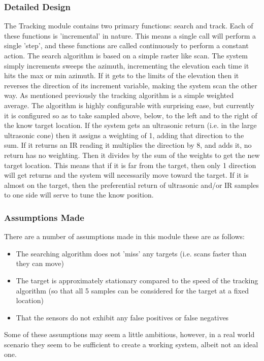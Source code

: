 \documentclass[]{report}
\begin{document}
\subsubsection{Detailed Design}
The Tracking module contains two primary functions: search and track. Each of these functions is 'incremental' in nature. This means a single call will perform a single 'step', and these functions are called continuously to perform a constant action. \newline
The search algorithm is based on a simple raster like scan. The system simply increments sweeps the azimuth, incrementing the elevation each time it hits the max or min azimuth. If it gets to the limits of the elevation then it reverses the direction of its increment variable, making the system scan the other way. \newline
As mentioned previously the tracking algorithm is a simple weighted average. The algorithm is highly configurable with surprising ease, but currently it is configured so as to take sampled above, below, to the left and to the right of the know target location. If the system gets an ultrasonic return (i.e. in the large ultrasonic cone) then it assigns a weighting of 1, adding that direction to the sum. If it returns an IR reading it multiplies the direction by 8, and adds it, no return has no weighting. Then it divides by the sum of the weights to get the new target location. \newline
This means that if it is far from the target, then only 1 direction will get returns and the system will necessarily move toward the target. If it is almost on the target, then the preferential return of ultrasonic and/or IR samples to one side will serve to tune the know position.

\subsubsection{Assumptions Made}
There are a number of assumptions made in this module these are as follows:
\begin{itemize}
	\item The searching algorithm does not 'miss' any targets (i.e. scans faster than they can move)
	\item The target is approximately stationary compared to the speed of the tracking algorithm (so that all 5 samples can be considered for the target at a fixed location)
	\item That the sensors do not exhibit any false positives or false negatives
\end{itemize}
Some of these assumptions may seem a little ambitious, however, in a real world scenario they seem to be sufficient to create a working system, albeit not an ideal one.
\end{document}
